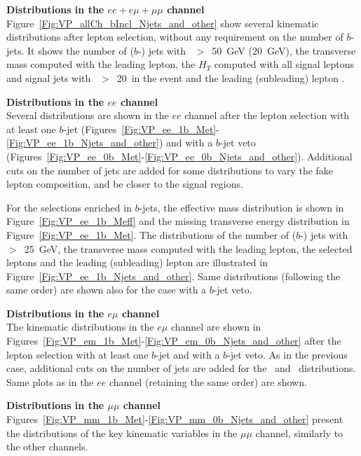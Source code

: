 \par {\bf Distributions in the $ee+e\mu+\mu\mu$ channel \\}
Figure~\ref{Fig:VP_allCh_bIncl_Njets_and_other} show several kinematic distributions 
after lepton selection, without any requirement on the number of $b$-jets. It shows the number of ($b$-) jets with \pt~$>$~50~GeV (20~GeV), the transverse mass computed with the leading lepton, 
the $H_T$ computed with all signal leptons and signal jets with \pt~$>$~20~\GeV in the event and the leading (subleading) lepton \pt.

\par {\bf Distributions in the $ee$ channel \\} 
Several distributions are shown in the $ee$ channel after the lepton selection with at least one $b$-jet (Figures~\ref{Fig:VP_ee_1b_Met}-\ref{Fig:VP_ee_1b_Njets_and_other}) 
and with a $b$-jet veto (Figures~\ref{Fig:VP_ee_0b_Met}-\ref{Fig:VP_ee_0b_Njets_and_other}). 
Additional cuts on the number of jets are added for some distributions to vary the fake lepton composition, and be closer to the signal regions. 

For the selections enriched in $b$-jets, the effective mass distribution is shown in Figure~\ref{Fig:VP_ee_1b_Meff} 
and the missing transverse energy distribution in Figure~\ref{Fig:VP_ee_1b_Met}. 
The distributions of the number of ($b$-) jets with \pt~$>$~25~GeV, the transverse mass computed with the leading lepton, the selected leptons \pt and the leading (subleading) lepton \pt are illustrated in Figure~\ref{Fig:VP_ee_1b_Njets_and_other}. 
Same distributions (following the same order) are shown also for the case with a $b$-jet veto.

\par {\bf Distributions in the $e\mu$ channel \\}
The kinematic distributions in the $e\mu$ channel are shown in Figures~\ref{Fig:VP_em_1b_Met}-\ref{Fig:VP_em_0b_Njets_and_other} after the lepton selection with at least one $b$-jet and with a $b$-jet veto. As in the previous case, additional cuts on the number of jets are added for the \meff\ and \met\ distributions. Same plots as in the $ee$ channel (retaining the same order) are shown. 

\par {\bf Distributions in the $\mu\mu$ channel \\}
Figures~\ref{Fig:VP_mm_1b_Met}-\ref{Fig:VP_mm_0b_Njets_and_other} present the distributions of the key kinematic variables in the $\mu\mu$ channel, 
similarly to the other channels. 

